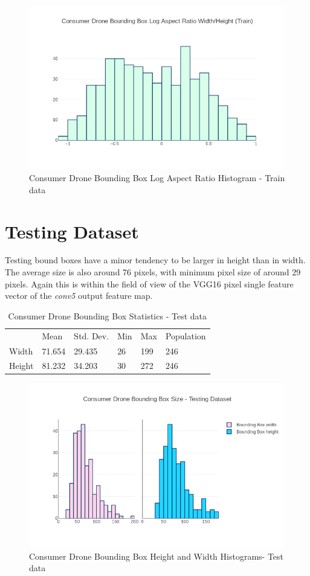 \documentclass{article}
\begin{document}
\begin{figure}[h]
\centering
\label{consumerdronetrainaspect}
\includegraphics[scale=0.4]{images/train-aspect.png}
\caption{Consumer Drone Bounding Box Log Aspect Ratio Histogram - Train data}
\end{figure}

\section{Testing Dataset}

Testing bound boxes have a minor tendency to be larger in height than in width. The average size is also around 76 pixels, with minimum pixel size of around 29 pixels. Again this is within the field of view of the VGG16 pixel single feature vector of the \textit{conv5} output feature map. 

\begin{table}[ht]
\caption{Consumer Drone Bounding Box Statistics - Test data}
\centering
\begin{tabular}{llllll}
       & Mean   & Std. Dev. & Min & Max & Population\\
Width  & 71.654 & 29.435 & 26 & 199 & 246 \\
Height & 81.232 & 34.203 & 30 & 272 & 246
\end{tabular}
\end{table}

\begin{figure}[h]
\centering
\label{consumerdronetesthist}
\includegraphics[scale=0.4]{images/test-histogram.png}
\caption{Consumer Drone Bounding Box Height and Width Histograms- Test data}
\end{figure}
\end{document}
